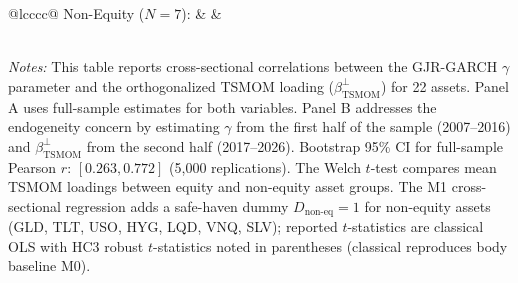 \begin{table}[H]
\begin{threeparttable}
\begin{tabular}{@{}lcccc@{}}
Non-Equity ($N = 7$): &  &  \\
 \\
\bottomrule
\end{tabular}
\begin{tablenotes}
\small
\item \textit{Notes:} This table reports cross-sectional correlations between the GJR-GARCH $\gamma$ parameter and the orthogonalized TSMOM loading ($\beta_{\text{TSMOM}}^{\perp}$) for 22 assets. Panel A uses full-sample estimates for both variables. Panel B addresses the endogeneity concern by estimating $\gamma$ from the first half of the sample (2007--2016) and $\beta_{\text{TSMOM}}^{\perp}$ from the second half (2017--2026). Bootstrap 95\% CI for full-sample Pearson $r$: $[0.263, 0.772]$ (5,000 replications). The Welch $t$-test compares mean TSMOM loadings between equity and non-equity asset groups. The M1 cross-sectional regression adds a safe-haven dummy $D_{\text{non-eq}} = 1$ for non-equity assets (GLD, TLT, USO, HYG, LQD, VNQ, SLV); reported $t$-statistics are classical OLS with HC3 robust $t$-statistics noted in parentheses (classical reproduces body baseline M0).
\end{tablenotes}
\end{threeparttable}
\end{table}

